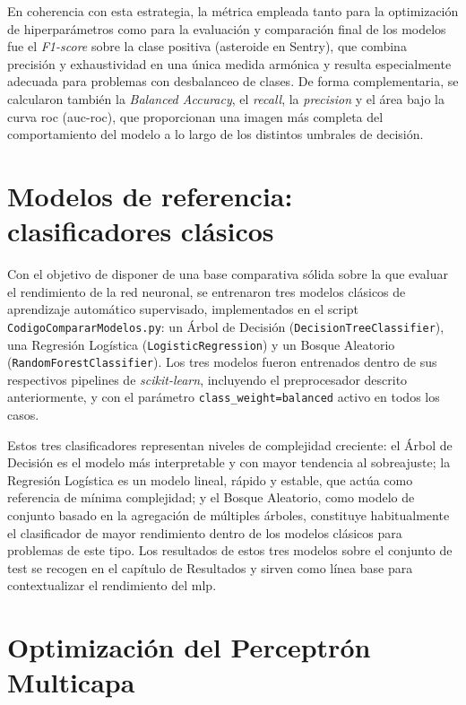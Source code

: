 \documentclass[12pt]{report} %
\begin{document}
En coherencia con esta estrategia, la métrica empleada tanto para la optimización de hiperparámetros como para la evaluación y comparación final de los modelos fue el \textit{F1-score} sobre la clase positiva (asteroide en Sentry), que combina precisión y exhaustividad en una única medida armónica y resulta especialmente adecuada para problemas con desbalanceo de clases. De forma complementaria, se calcularon también la \textit{Balanced Accuracy}, el \textit{recall}, la \textit{precision} y el área bajo la curva \gls{roc} (\gls{auc}-\gls{roc}), que proporcionan una imagen más completa del comportamiento del modelo a lo largo de los distintos umbrales de decisión.
 
\section{Modelos de referencia: clasificadores clásicos}
 
Con el objetivo de disponer de una base comparativa sólida sobre la que evaluar el rendimiento de la red neuronal, se entrenaron tres modelos clásicos de aprendizaje automático supervisado, implementados en el script \texttt{CodigoCompararModelos.py}: un Árbol de Decisión (\texttt{DecisionTreeClassifier}), una Regresión Logística (\texttt{LogisticRegression}) y un Bosque Aleatorio (\texttt{RandomForestClassifier}). Los tres modelos fueron entrenados dentro de sus respectivos pipelines de \textit{scikit-learn}, incluyendo el preprocesador descrito anteriormente, y con el parámetro \texttt{class\_weight=balanced} activo en todos los casos.
 
Estos tres clasificadores representan niveles de complejidad creciente: el Árbol de Decisión es el modelo más interpretable y con mayor tendencia al sobreajuste; la Regresión Logística es un modelo lineal, rápido y estable, que actúa como referencia de mínima complejidad; y el Bosque Aleatorio, como modelo de conjunto basado en la agregación de múltiples árboles, constituye habitualmente el clasificador de mayor rendimiento dentro de los modelos clásicos para problemas de este tipo. Los resultados de estos tres modelos sobre el conjunto de test se recogen en el capítulo de Resultados y sirven como línea base para contextualizar el rendimiento del \gls{mlp}.
 
\section{Optimización del Perceptrón Multicapa}
 
\end{document}
